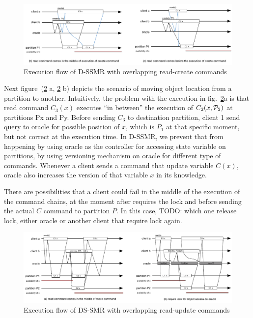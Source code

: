 \begin{figure}
\begin{minipage}[b]{1.0\linewidth} %
\centering
      \includegraphics[width=1\linewidth]{figures/read_overlap}
\end{minipage}
\caption{Execution flow of D-SSMR with overlapping read-create commands}
\label{fig:readoverlap}
\end{figure}


Next figure~(\ref{fig:updateoverlap} a, \ref{fig:updateoverlap} b) depicts the scenario of moving object location from a partition to another. Intuitively, the problem with the execution in fig.~\ref{fig:updateoverlap}a is that read command $C_3(x)$ executes “in between” the execution of $C_2(x,\mathcal{P}_2)$ at partitions Px and Py. Before sending $C_3$ to destination partition, client 1 send query to oracle for possible position of $x$, which is $P_1$ at that specific moment, but not correct at the execution time. In D-SSMR, we prevent that from happening by using oracle as the controller for accessing state variable on partitions, by using versioning mechanism on oracle for different type of commands. Whenever a client sends a command that update variable $C(x)$, oracle also increases the version of that variable $x$ in its knowledge. 

There are possibilities that a client could fail in the middle of the execution of the command chains, at the moment after requires the lock and before sending the actual $C$ command to partition $P$. In this case, TODO: which one release lock, either oracle or another client that require lock again. 

\begin{figure}
\begin{minipage}[b]{1.0\linewidth} %
\centering
      \includegraphics[width=1\linewidth]{figures/update_overlap}
\end{minipage}
\caption{Execution flow of DS-SMR with overlapping read-update commands}
\label{fig:updateoverlap}
\end{figure}


